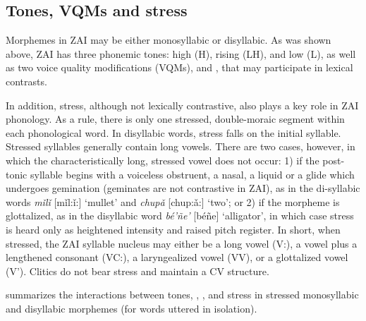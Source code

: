 \newpage 
\subsection{Tones, VQMs and stress}\label{tones}
\largerpage[-1]
Morphemes in ZAI may be either monosyllabic or disyllabic. As was shown above, ZAI has three phonemic tones: high (H), rising (LH), and low (L), as well as two voice quality modifications (VQMs),  and , that may participate in lexical contrasts. 

In addition, stress, although not lexically contrastive, also plays a key role in ZAI phonology. As a rule, there is only one stressed, double-moraic segment within each phonological word. In disyllabic words, stress falls on the initial syllable. Stressed syllables generally contain long vowels. There are two cases, however, in which the characteristically long, stressed vowel does not occur: 1) if the post-tonic syllable begins with a voiceless obstruent, a nasal, a liquid or a glide which undergoes gemination (geminates are not contrastive in ZAI), as in the di-syllabic words \textit{m\v{i}l\v{i}} [m\v{i}l:\v{i}:] `mullet' and \textit{chup\v{a}} [chup:\v{a}:] `two'; or 2) if the morpheme is glottalized, as in the disyllabic word \textit{bé'ñe'} [béñe] `alligator', in which case stress is heard only as heightened intensity and raised pitch register. In short, when stressed, the ZAI syllable nucleus may either be a long vowel (V:), a vowel plus a lengthened consonant (VC:), a laryngealized vowel (VV), or a glottalized vowel (V'). Clitics do not bear stress and maintain a CV structure.

 summarizes the interactions between tones, , , and stress in stressed monosyllabic and disyllabic morphemes (for words uttered in isolation).

